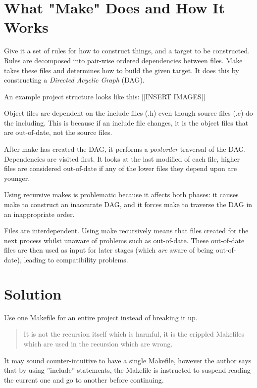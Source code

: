 \section{What "Make" Does and How It Works}

Give it a set of rules for how to construct things, and a target to be constructed. Rules 
are decomposed into pair-wise ordered dependencies between files. Make takes these files 
and determines how to build the given target. It does this by constructing a
\textit{Directed Acyclic Graph} (DAG).

An example project structure looks like this:
[[INSERT IMAGES]]

Object files are dependent on the include files (.h) even though source files (.c) do the including.
This is because if an include file changes, it is the object files that are out-of-date, not the 
source files.

After make has created the DAG, it performs a \textit{postorder} traversal of the DAG. Dependencies are 
visited first. It looks at the last modified of each file, higher files are considered out-of-date if
any of the lower files they depend upon are younger.

Using recursive makes is problematic because it affects both phases: it causes make to construct an
inaccurate DAG, and it forces make to traverse the DAG in an inappropriate order.

Files are interdependent. Using make recursively means that files created for the next process whilst
unaware of problems such as out-of-date. These out-of-date files are then used as input for later stages
(which \textit{are} aware of being out-of-date), leading to compatibility problems.

\section{Solution}

Use one Makefile for an entire project instead of breaking it up.

\begin{quote}
It is not the recursion itself which is harmful, it is the crippled Makefiles which are used
in the recursion which are wrong.
\end{quote}

It may sound counter-intuitive to have a single Makefile, however the author says that by using ''include''
statements, the Makefile is instructed to suspend reading the current one and go to another before continuing.

